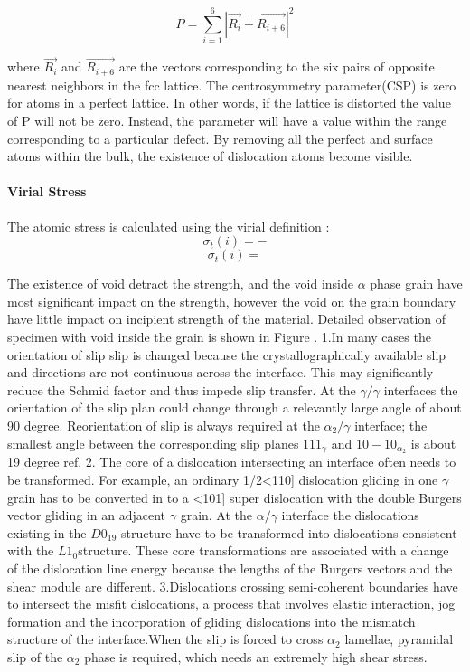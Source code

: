 \documentclass[final,5p,times,twocolumn]{elsarticle}
\begin{document}
\begin{equation} \label{eq:csp} 
	P = \displaystyle\sum_{i=1}^{6}|\vec{R_i}+\vec{R_{i+6}}|^2
\end{equation}

where $\vec{R_i}$ and $\vec{R_{i+6}}$ are the vectors corresponding to the six pairs of opposite nearest neighbors in the fcc lattice. The centrosymmetry parameter(CSP) is zero for atoms in a perfect lattice. In other words, if the lattice is distorted the value of P will not be zero. Instead, the parameter will have a value within the range corresponding to a particular defect. By removing all the perfect and surface atoms within the bulk, the existence of dislocation atoms become visible.
	
\paragraph{Virial Stress}
The atomic stress is calculated using the virial definition :
$$\sigma_t(i)=-$$
$$\sigma_t(i)= $$
 


The existence of void detract the strength, and the void inside $\alpha$ phase grain have most significant  impact on the strength, however the void on the grain boundary have little impact on incipient strength of the material. Detailed observation of specimen with void inside the grain is shown in Figure \cite{}.
1.In many cases the orientation of slip slip is changed because the crystallographically available slip and directions are not continuous across the interface. This may significantly reduce the Schmid factor and thus impede slip transfer. At the $\gamma/\gamma$ interfaces the orientation of the slip plan could change through a relevantly large angle of about 90 degree. Reorientation of slip is always required at the $\alpha_{2} / \gamma$ interface; the smallest angle between the corresponding slip planes ${1 1 1 }_{\gamma}$ and ${ 1 0 -1 0}_{\alpha_2}$ is about 19 degree ref{}.
2. The core of  a dislocation intersecting an interface often needs to be transformed. For example, an ordinary 1/2<110] dislocation gliding in one $\gamma$ grain has to be converted in to a <101] super dislocation with the double Burgers vector gliding in an adjacent $\gamma$ grain. At the $\alpha/\gamma$ interface the dislocations existing in the $D0_{19}$ structure have to be transformed into dislocations consistent with the $L1_0$structure. These core transformations are associated with a change of the dislocation line energy because the lengths of the Burgers vectors and the shear module are different.
3.Dislocations crossing semi-coherent boundaries have to intersect the misfit dislocations, a process that involves elastic interaction, jog formation and the incorporation of gliding dislocations into the mismatch structure of the interface.When the slip is forced to cross $\alpha_2$ lamellae, pyramidal slip of the $\alpha_2$ phase is required, which needs an extremely high shear stress.
\end{document}
